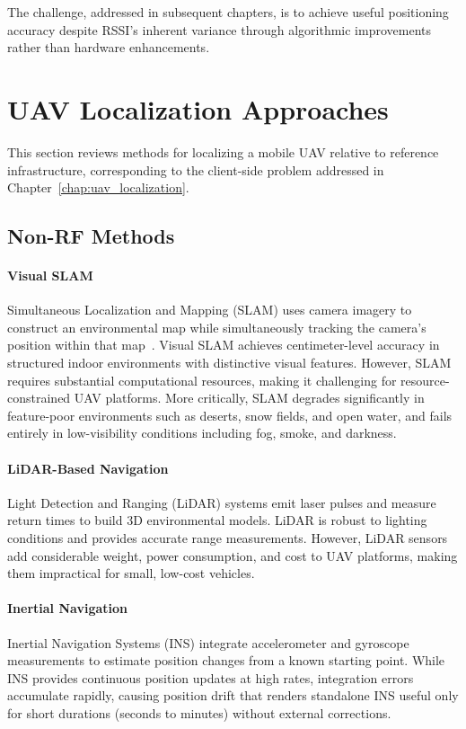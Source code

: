 \documentclass[master,final,11pt]{iscs-thesis}
\begin{document}
The challenge, addressed in subsequent chapters, is to achieve useful positioning accuracy despite RSSI's inherent variance through algorithmic improvements rather than hardware enhancements.

\section{UAV Localization Approaches}
\label{sec:uav_localization_related}

This section reviews methods for localizing a mobile UAV relative to reference infrastructure, corresponding to the client-side problem addressed in Chapter~\ref{chap:uav_localization}.

\subsection{Non-RF Methods}

\paragraph{Visual SLAM}
Simultaneous Localization and Mapping (SLAM) uses camera imagery to construct an environmental map while simultaneously tracking the camera's position within that map~\cite{murartal2017orbslam2}.
Visual SLAM achieves centimeter-level accuracy in structured indoor environments with distinctive visual features.
However, SLAM requires substantial computational resources, making it challenging for resource-constrained UAV platforms.
More critically, SLAM degrades significantly in feature-poor environments such as deserts, snow fields, and open water, and fails entirely in low-visibility conditions including fog, smoke, and darkness.

\paragraph{LiDAR-Based Navigation}
Light Detection and Ranging (LiDAR) systems emit laser pulses and measure return times to build 3D environmental models.
LiDAR is robust to lighting conditions and provides accurate range measurements.
However, LiDAR sensors add considerable weight, power consumption, and cost to UAV platforms, making them impractical for small, low-cost vehicles.

\paragraph{Inertial Navigation}
Inertial Navigation Systems (INS) integrate accelerometer and gyroscope measurements to estimate position changes from a known starting point.
While INS provides continuous position updates at high rates, integration errors accumulate rapidly, causing position drift that renders standalone INS useful only for short durations (seconds to minutes) without external corrections.
\end{document}
